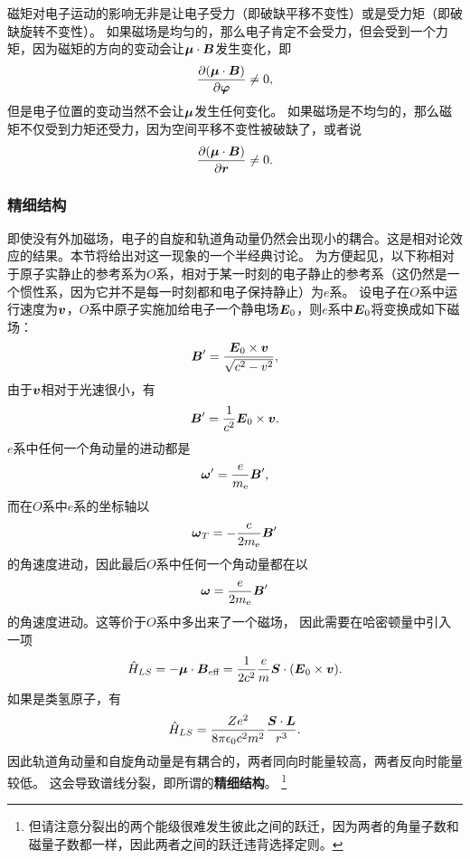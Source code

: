 \documentclass[UTF8, a4paper]{ctexart}
\begin{document}
磁矩对电子运动的影响无非是让电子受力（即破缺平移不变性）或是受力矩（即破缺旋转不变性）。
如果磁场是均匀的，那么电子肯定不会受力，但会受到一个力矩，因为磁矩的方向的变动会让$\vb*{\mu} \cdot \vb*{B}$发生变化，即
\[
    \pdv{(\vb*{\mu} \cdot \vb*{B})}{\vb*{\varphi}} \neq 0,
\]
但是电子位置的变动当然不会让$\vb*{\mu}$发生任何变化。
如果磁场是不均匀的，那么磁矩不仅受到力矩还受力，因为空间平移不变性被破缺了，或者说
\[
    \pdv{(\vb*{\mu} \cdot \vb*{B})}{\vb*{r}} \neq 0.
\]

\subsubsection{精细结构}

即使没有外加磁场，电子的自旋和轨道角动量仍然会出现小的耦合。这是相对论效应的结果。本节将给出对这一现象的一个半经典讨论。
为方便起见，以下称相对于原子实静止的参考系为$O$系，相对于某一时刻的电子静止的参考系（这仍然是一个惯性系，因为它并不是每一时刻都和电子保持静止）为$e$系。
设电子在$O$系中运行速度为$\vb*{v}$，$O$系中原子实施加给电子一个静电场$\vb*{E}_0$，则$e$系中$\vb*{E}_0$将变换成如下磁场：
\[
    \vb*{B}' = \frac{\vb*{E}_0 \times \vb*{v}}{\sqrt{c^2 - v^2}},
\]
由于$\vb*{v}$相对于光速很小，有
\begin{equation}
    \vb*{B}' = \frac{1}{c^2} \vb*{E}_0 \times \vb*{v}.
\end{equation}
$e$系中任何一个角动量的进动都是%
\[
    \vb*{\omega}' = \frac{e}{m_\text{e}} \vb*{B}',
\]
而在$O$系中$e$系的坐标轴以
\[
    \vb*{\omega}_T = - \frac{e}{2 m_\text{e}} \vb*{B}'
\]
的角速度进动，因此最后$O$系中任何一个角动量都在以
\begin{equation}
    \vb*{\omega} = \frac{e}{2 m_\text{e}} \vb*{B}'
\end{equation}
的角速度进动。这等价于$O$系中多出来了一个磁场，%
因此需要在哈密顿量中引入一项
\begin{equation}
    \hat{H}_{LS} = - \vb*{\mu} \cdot \vb*{B}_\text{eff} = \frac{1}{2c^2} \frac{e}{m} \vb*{S} \cdot (\vb*{E}_0 \times \vb*{v}).
\end{equation}
如果是类氢原子，有
\begin{equation}
    \hat{H}_{LS} = \frac{Ze^2}{8 \pi \epsilon_0 c^2 m^2} \frac{\vb*{S} \cdot \vb*{L}}{r^3}.
\end{equation}
因此轨道角动量和自旋角动量是有耦合的，两者同向时能量较高，两者反向时能量较低。
这会导致谱线分裂，即所谓的\textbf{精细结构}。%
\footnote{但请注意分裂出的两个能级很难发生彼此之间的跃迁，因为两者的角量子数和磁量子数都一样，因此两者之间的跃迁违背选择定则。}%
\end{document}
